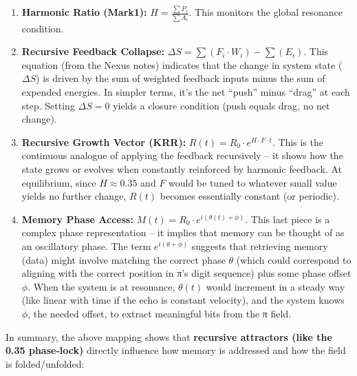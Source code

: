 \documentclass[11pt]{article}
\providecommand{\tightlist}{%
      \setlength{\itemsep}{0pt}\setlength{\parskip}{0pt}}
\begin{document}
\begin{enumerate}
\def\labelenumi{\arabic{enumi}.}
\tightlist
\item
  \textbf{Harmonic Ratio (Mark1):} \(H = \frac{\sum P_i}{\sum A_i}\).
  This monitors the global resonance condition.
\item
  \textbf{Recursive Feedback Collapse:}
  \(\Delta S = \sum (F_i \cdot W_i) - \sum(E_i)\). This equation (from
  the Nexus notes) indicates that the change in system state
  (\(\Delta S\)) is driven by the sum of weighted feedback inputs minus
  the sum of expended energies. In simpler terms, it's the net ``push''
  minus ``drag'' at each step. Setting \(\Delta S = 0\) yields a closure
  condition (push equals drag, no net change).
\item
  \textbf{Recursive Growth Vector (KRR):}
  \(R(t) = R_0 \cdot e^{H \cdot F \cdot t}\). This is the continuous
  analogue of applying the feedback recursively -- it shows how the
  state grows or evolves when constantly reinforced by harmonic
  feedback. At equilibrium, since \(H \approx 0.35\) and \(F\) would be
  tuned to whatever small value yields no further change, \(R(t)\)
  becomes essentially constant (or periodic).
\item
  \textbf{Memory Phase Access:}
  \(M(t) = R_0 \cdot e^{i(\theta(t) + \phi)}\). This last piece is a
  complex phase representation -- it implies that memory can be thought
  of as an oscillatory phase. The term \(e^{i(\theta + \phi)}\) suggests
  that retrieving memory (data) might involve matching the correct phase
  \(\theta\) (which could correspond to aligning with the correct
  position in π's digit sequence) plus some phase offset \(\phi\). When
  the system is at resonance, \(\theta(t)\) would increment in a steady
  way (like linear with time if the echo is constant velocity), and the
  system knows \(\phi\), the needed offset, to extract meaningful bits
  from the π field.
\end{enumerate}

In summary, the above mapping shows that \textbf{recursive attractors
(like the 0.35 phase-lock)} directly influence how memory is addressed
and how the field is folded/unfolded:
\end{document}
